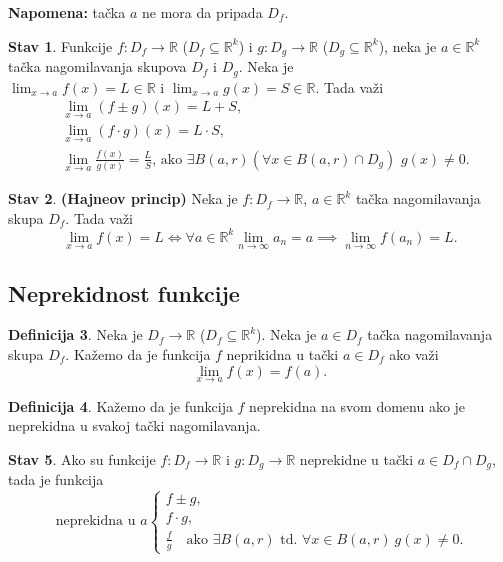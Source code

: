 \documentclass[11pt]{article}
\theoremstyle{definition}
\newtheorem{definicija}{Definicija}[section]
\newtheorem{stav}[definicija]{Stav}
\theoremstyle{serbnodot}
\newcommand{\napomena}[1]{%
    \textbf{Napomena:} #1
}
\begin{document}
\napomena{tačka \(a\)
    ne mora da pripada \(D_f\).}


\begin{stav}
    Funkcije \(f: D_f \to \mathbb{R}\) (\(D_f \subseteq \mathbb{R}^k\)) i
    \(g: D_g \to \mathbb{R}\) (\(D_g \subseteq \mathbb{R}^k\)), neka je 
    \(a \in \mathbb{R}^k\) tačka nagomilavanja skupova \(D_f\) i \(D_g\). Neka je
    \(\lim_{x \to a}f(x) = L \in \mathbb{R} \text{ i } 
    \lim_{x \to a}g(x) = S \in \mathbb{R}\). Tada važi
    \begin{align}
        &\lim_{x \to a} (f\pm g)(x) = L + S, \\
        &\lim_{x \to a} (f \cdot g)(x) = L \cdot S, \\
        &\lim_{x \to a} \frac{f(x)}{g(x)} = \frac{L}{S} 
        \text{, ako \(\exists B(a, r) (\forall x \in B(a,r) \cap D_g)\)
         \(g(x) \neq 0\)}.
    \end{align}
\end{stav}

\begin{stav}
    \textbf{(Hajneov princip)}
    Neka je \(f: D_f \to \mathbb{R}\), \(a \in \mathbb{R}^k\) tačka nagomilavanja
    skupa \(D_f\). Tada važi
    \[
        \lim_{x \to a} f(x) = L \iff \forall a \in \mathbb{R}^k 
        \lim_{n \to \infty} a_n = a \implies \lim_{n \to \infty} f(a_n) = L. 
    \]
\end{stav}


\subsection{Neprekidnost funkcije}

\begin{definicija}
    Neka je \(D_f \to \mathbb{R}\) (\(D_f \subseteq \mathbb{R}^k\)). Neka je 
    \(a \in D_f\) tačka nagomilavanja skupa \(D_f\). Kažemo da je
    funkcija \(f\) neprikidna u tački \(a \in D_f\) ako važi
    \[
        \lim_{x \to a}f(x) = f(a).
    \]
\end{definicija}

\begin{definicija}
    Kažemo da je funkcija \(f\) neprekidna na svom domenu ako je neprekidna
    u svakoj tački nagomilavanja.
\end{definicija}

\begin{stav}
    Ako su funkcije \(f: D_f \to \mathbb{R}\) i \(g: D_g \to \mathbb{R}\) neprekidne
    u tački \(a \in D_f \cap D_g\), tada je funkcija
    \[
        \text{ neprekidna u } a
        \left\{
        \begin{aligned}
        f \pm g, \\
        f \cdot g, \\
        \frac{f}{g} \quad
        \text{ako } \exists B(a,r) \text{ td. }
        \forall x \in B(a,r) \ g(x) \neq 0.
        \end{aligned}
        \right.
    \]
\end{stav}
\end{document}
